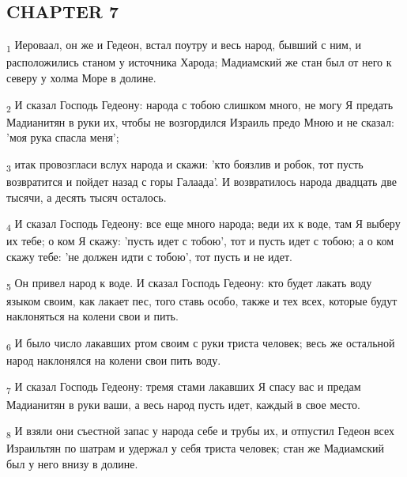 \subsection{CHAPTER 7}
\begin{tcolorbox}
\textsubscript{1} Иероваал, он же и Гедеон, встал поутру и весь народ, бывший с ним, и расположились станом у источника Харода; Мадиамский же стан был от него к северу у холма Море в долине.
\end{tcolorbox}
\begin{tcolorbox}
\textsubscript{2} И сказал Господь Гедеону: народа с тобою слишком много, не могу Я предать Мадианитян в руки их, чтобы не возгордился Израиль предо Мною и не сказал: 'моя рука спасла меня';
\end{tcolorbox}
\begin{tcolorbox}
\textsubscript{3} итак провозгласи вслух народа и скажи: 'кто боязлив и робок, тот пусть возвратится и пойдет назад с горы Галаада'. И возвратилось народа двадцать две тысячи, а десять тысяч осталось.
\end{tcolorbox}
\begin{tcolorbox}
\textsubscript{4} И сказал Господь Гедеону: все еще много народа; веди их к воде, там Я выберу их тебе; о ком Я скажу: 'пусть идет с тобою', тот и пусть идет с тобою; а о ком скажу тебе: 'не должен идти с тобою', тот пусть и не идет.
\end{tcolorbox}
\begin{tcolorbox}
\textsubscript{5} Он привел народ к воде. И сказал Господь Гедеону: кто будет лакать воду языком своим, как лакает пес, того ставь особо, также и тех всех, которые будут наклоняться на колени свои и пить.
\end{tcolorbox}
\begin{tcolorbox}
\textsubscript{6} И было число лакавших ртом своим с руки триста человек; весь же остальной народ наклонялся на колени свои пить воду.
\end{tcolorbox}
\begin{tcolorbox}
\textsubscript{7} И сказал Господь Гедеону: тремя стами лакавших Я спасу вас и предам Мадианитян в руки ваши, а весь народ пусть идет, каждый в свое место.
\end{tcolorbox}
\begin{tcolorbox}
\textsubscript{8} И взяли они съестной запас у народа себе и трубы их, и отпустил Гедеон всех Израильтян по шатрам и удержал у себя триста человек; стан же Мадиамский был у него внизу в долине.
\end{tcolorbox}

